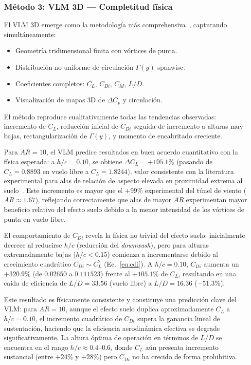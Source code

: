 \documentclass[twocolumn]{article}
\begin{document}
\subsubsection{Método 3: VLM 3D --- Completitud física}

El VLM 3D emerge como la metodología más comprehensiva~\cite{katz2001}, capturando simultáneamente:

\begin{itemize}
\item Geometría tridimensional finita con vórtices de punta.
\item Distribución no uniforme de circulación $\Gamma(y)$ spanwise.
\item Coeficientes completos: $C_L$, $C_{Di}$, $C_M$, $L/D$.
\item Visualización de mapas 3D de $\Delta C_p$ y circulación.
\end{itemize}

El método reproduce cualitativamente todas las tendencias observadas: incremento de $C_L$, reducción inicial de $C_{Di}$ seguida de incremento a alturas muy bajas, rectangularización de $\Gamma(y)$, y momento de encabritado creciente.

Para $\mathit{AR} = 10$, el VLM predice resultados en buen acuerdo cuantitativo con la física esperada: a $h/c = 0.10$, se obtiene $\Delta C_L = +105.1\%$ (pasando de $C_L = 0.8893$ en vuelo libre a $C_L = 1.8244$), valor consistente con la literatura experimental para alas de relación de aspecto elevada en proximidad extrema al suelo~\cite{zerihan2000}. Este incremento es mayor que el $+99\%$ experimental del túnel de viento ($\mathit{AR} \approx 1.67$), reflejando correctamente que alas de mayor $\mathit{AR}$ experimentan mayor beneficio relativo del efecto suelo debido a la menor intensidad de los vórtices de punta en vuelo libre.

El comportamiento de $C_{Di}$ revela la física no trivial del efecto suelo: inicialmente decrece al reducirse $h/c$ (reducción del \textit{downwash}), pero para alturas extremadamente bajas ($h/c < 0.15$) comienza a incrementarse debido al crecimiento cuadrático $C_{Di} \sim C_L^2$ (Ec.~\eqref{eq:cdi}). A $h/c = 0.10$, $C_{Di}$ aumenta un $+320.9\%$ (de $0.02650$ a $0.111523$) frente al $+105.1\%$ de $C_L$, resultando en una caída de eficiencia de $L/D = 33.56$ (vuelo libre) a $L/D = 16.36$ ($-51.3\%$). 

Este resultado es físicamente consistente y constituye una predicción clave del VLM: para $\mathit{AR} = 10$, aunque el efecto suelo duplica aproximadamente $C_L$ a $h/c = 0.10$, el incremento cuadrático de $C_{Di}$ supera la ganancia lineal de sustentación, haciendo que la eficiencia aerodinámica efectiva se degrade significativamente. La altura óptima de operación en términos de $L/D$ se encuentra en el rango $h/c \approx 0.4$--$0.6$, donde $C_L$ aún presenta incremento sustancial (entre $+24$\% y $+28\%$) pero $C_{Di}$ no ha crecido de forma prohibitiva.
\end{document}
